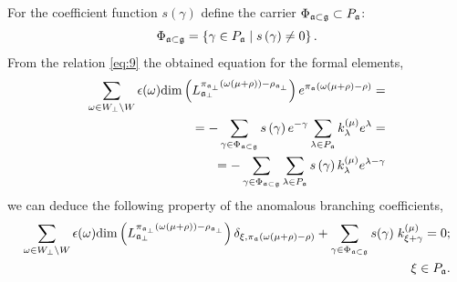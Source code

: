 \documentclass[12pt]{iopart}
\begin{document}
For the coefficient function $s\left( \gamma \right) $ define the carrier $\Phi _{\frak{a%
}\subset \frak{g}}\subset P_{\frak{a}}$:
\begin{equation}
\Phi _{\frak{a}\subset \frak{g}}=\left\{ \gamma \in P_{\frak{a}}\mid s\left(
\gamma \right) \neq 0\right\} .  \label{phi-d}
\end{equation}
From the relation \ref{eq:9} the obtained equation for the formal elements,
\begin{eqnarray*}
  \label{eq:16}
  \sum_{\omega\in W_{\bot}\backslash W} \epsilon(\omega) \mathrm{dim}\left(L^{\pi_{\mathfrak{a}_{\bot}}(\omega(\mu+\rho))-\rho_{\mathfrak{a}_{\bot}}}_{\mathfrak{a}_{\bot}}\right) e^{\pi_{\mathfrak{a}}(\omega(\mu+\rho)-\rho)}=\\
  = -\sum_{\gamma \in \Phi _{\frak{a}\subset \frak{g}}} s\left( \gamma \right) e^{-\gamma }\sum_{\lambda \in P_{\frak{a}}}
  k_{\lambda }^{\left( \mu \right) }e^{\lambda } =\\
  =-\sum_{\gamma \in \Phi _{\frak{a}\subset \frak{g}}}\sum_{\lambda \in P_{\frak{a}}}s\left( \gamma \right) k_{\lambda }^{\left( \mu \right)}e^{\lambda -\gamma }
\end{eqnarray*}
we can deduce the following property of the anomalous branching coefficients,
\begin{eqnarray*}
  \label{eq:17}
   \sum_{\omega\in W_{\bot}\backslash W} \epsilon(\omega) \mathrm{dim}\left(L^{\pi_{\mathfrak{a}_{\bot}}(\omega(\mu+\rho))-\rho_{\mathfrak{a}_{\bot}}}_{\mathfrak{a}_{\bot}}\right) \delta_{\xi,\pi_{\mathfrak{a}}(\omega(\mu+\rho)-\rho)}+
   \sum_{\gamma \in \Phi _{\frak{a}\subset \frak{g}}} s(\gamma)\; k^{(\mu)}_{\xi+\gamma}=0;\\ \xi\in P_{\mathfrak{a}}.
\end{eqnarray*}
\end{document}
